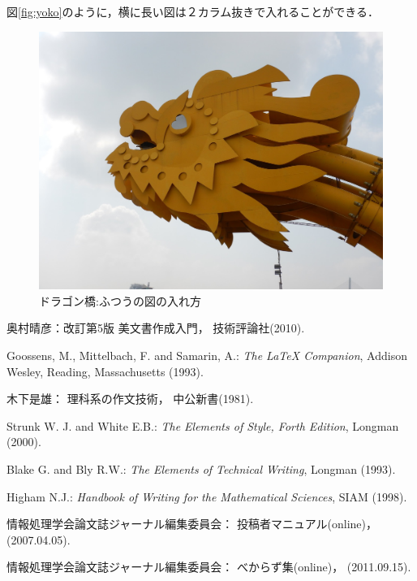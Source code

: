 \documentclass[submit,techreq]{ec2017}
\begin{document}
図\ref{fig:yoko}のように，横に長い図は２カラム抜きで入れることができる．

\begin{figure}
  \includegraphics[width=0.9\columnwidth]{dragon.jpg}
  \caption{ドラゴン橋:ふつうの図の入れ方}
  \label{fig:dragon}
\end{figure}





\begin{thebibliography}{10}



奥村晴彦：改訂第5版 \LaTeXe 美文書作成入門，
技術評論社(2010).

Goossens, M., Mittelbach, F. and Samarin, A.:
{\it The LaTeX Companion},
Addison Wesley, Reading, Massachusetts (1993).

木下是雄：
理科系の作文技術，
中公新書(1981).

Strunk W. J. and White E.B.:
{\it The Elements of Style, Forth Edition},
Longman (2000).

Blake G. and Bly R.W.:
{\it The Elements of Technical Writing},
Longman (1993).

Higham N.J.:
{\it Handbook of Writing for the Mathematical Sciences},
SIAM (1998).

情報処理学会論文誌ジャーナル編集委員会：
投稿者マニュアル(online)，
(2007.04.05).

情報処理学会論文誌ジャーナル編集委員会：
べからず集(online)，
(2011.09.15).

\end{thebibliography}
\end{document}
